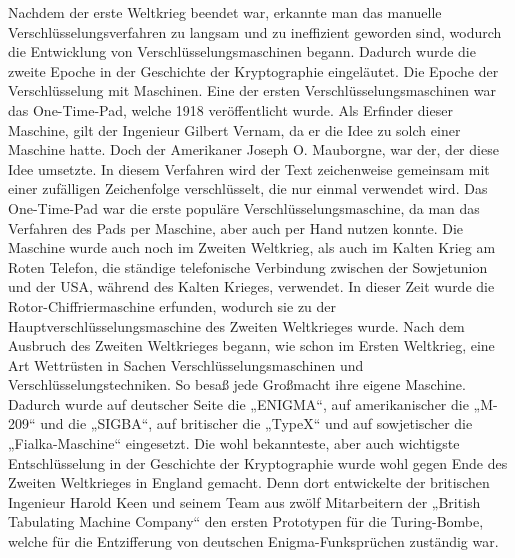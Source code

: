 Nachdem der erste Weltkrieg beendet war, erkannte man das manuelle Verschlüsselungsverfahren zu langsam und zu ineffizient geworden sind, wodurch die Entwicklung von Verschlüsselungsmaschinen begann. Dadurch wurde die zweite Epoche in der Geschichte der Kryptographie eingeläutet. Die Epoche der Verschlüsselung mit Maschinen. Eine der ersten Verschlüsselungsmaschinen war das One-Time-Pad, welche 1918 veröffentlicht wurde. Als Erfinder dieser Maschine, gilt der Ingenieur Gilbert Vernam, da er die Idee zu solch einer Maschine hatte. Doch der Amerikaner Joseph O. Mauborgne, war der, der diese Idee umsetzte. In diesem Verfahren wird der Text zeichenweise gemeinsam mit einer zufälligen Zeichenfolge verschlüsselt, die nur einmal verwendet wird. Das One-Time-Pad war die erste populäre Verschlüsselungsmaschine, da man das Verfahren des Pads per Maschine, aber auch per Hand nutzen konnte. Die Maschine wurde auch noch im Zweiten Weltkrieg, als auch im Kalten Krieg am Roten Telefon, die ständige telefonische Verbindung zwischen der Sowjetunion und der USA, während des Kalten Krieges, verwendet. In dieser Zeit wurde die Rotor-Chiffriermaschine erfunden, wodurch sie zu der Hauptverschlüsselungsmaschine des Zweiten Weltkrieges wurde. Nach dem Ausbruch des Zweiten Weltkrieges begann, wie schon im Ersten Weltkrieg, eine Art Wettrüsten in Sachen Verschlüsselungsmaschinen und Verschlüsselungstechniken. So besaß jede Großmacht ihre eigene Maschine. Dadurch wurde auf deutscher Seite die „ENIGMA“, auf amerikanischer die „M-209“ und die „SIGBA“, auf britischer die „TypeX“ und auf sowjetischer die „Fialka-Maschine“ eingesetzt. Die wohl bekannteste, aber auch wichtigste Entschlüsselung in der Geschichte der Kryptographie wurde wohl gegen Ende des Zweiten Weltkrieges in England gemacht. Denn dort entwickelte der britischen Ingenieur Harold Keen und seinem Team aus zwölf Mitarbeitern der „British Tabulating Machine Company“ den ersten Prototypen für die Turing-Bombe, welche für die Entzifferung von deutschen Enigma-Funksprüchen zuständig war.\\


